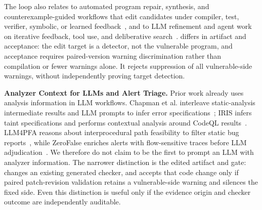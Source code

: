 The loop also relates to automated program repair, synthesis, and counterexample-guided workflows that edit candidates under compiler, test, verifier, symbolic, or learned feedback~\cite{clarke2000cegar,solarlezama2006sketch,legoues2012genprog,kim2013par,long2015spr,nguyen2013semfix,mechtaev2016angelix,long2016prophet}, and to LLM refinement and agent work on iterative feedback, tool use, and deliberative search~\cite{madaan2023selfrefine,shinn2023reflexion,yao2023react,schick2023toolformer,yao2023tree}. \toolname differs in artifact and acceptance: the edit target is a detector, not the vulnerable program, and acceptance requires paired-version warning discrimination rather than compilation or fewer warnings alone. It rejects suppression of all vulnerable-side warnings, without independently proving target detection.

\noindent\textbf{Analyzer Context for LLMs and Alert Triage.}\quad
Prior work already uses analysis information in LLM workflows.  Chapman et al. interleave static-analysis intermediate results and LLM prompts to infer error specifications~\cite{chapman2024interleaving}; IRIS infers taint specifications and performs contextual analysis around CodeQL results~\cite{li2025iris}.  LLM4PFA reasons about interprocedural path feasibility to filter static bug reports~\cite{du2025llm4pfa}, while ZeroFalse enriches alerts with flow-sensitive traces before LLM adjudication~\cite{iranmanesh2025zerofalse}.  We therefore do not claim to be the first to prompt an LLM with analyzer information.  The narrower distinction is the edited artifact and gate: \toolname changes an existing generated checker, and accepts that code change only if paired patch-revision validation retains a vulnerable-side warning and silences the fixed side.  Even this distinction is useful only if the evidence origin and checker outcome are independently auditable.
